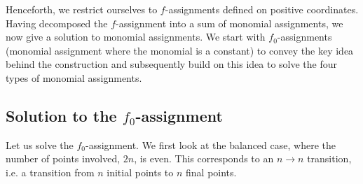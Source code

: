 \documentclass{theoretics}
\newcommand{\atul}[1]{#1} %
\begin{document}
%
%
%
%
%
%
%
%
%
%
%

%
%
%
%
%
%
%
%
%
%
%

%
%
%
%
%
%
%
%
%
%
%
%
%
%
%
%
%
%

\atul{Henceforth, we restrict ourselves to $f$-assignments defined on positive coordinates.} Having decomposed the $f$-assignment into a sum of monomial assignments, we now give a solution to monomial assignments. We start with $f_0$-assignments (monomial assignment where the monomial is a  constant) to convey the key idea behind the construction and subsequently build on this idea to solve the four types of monomial assignments. %


\subsection{Solution to the \texorpdfstring{$f_0$}{f 0}-assignment}
\label{subsec:f0algebraic}
%
%
Let us solve the $f_0$-assignment. We first look at
the balanced case, where the number of points involved, $2n$, is
even. This corresponds to an $n\to n$ transition, i.e. a transition from $n$ initial points to $n$ final points.
\end{document}
